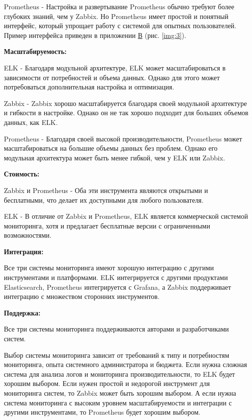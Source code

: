 Prometheus - Настройка и развертывание Prometheus обычно требуют более глубоких знаний, чем у Zabbix.
Но Prometheus имеет простой и понятный интерфейс, который упрощает работу с системой для опытных пользователей.
Пример интерфейса приведен в приложении \hyperlink{app-c}{В} (рис. \ref{img:3}).

\textbf{Масштабируемость:}

ELK - Благодаря модульной архитектуре, ELK может масштабироваться в зависимости от потребностей и объема данных.
Однако для этого может потребоваться дополнительная настройка и оптимизация.

Zabbix - Zabbix хорошо масштабируется благодаря своей модульной архитектуре и гибкости в настройке.
Однако он не так хорошо подходит для больших объемов данных, как ELK.

Prometheus - Благодаря своей высокой производительности, Prometheus может масштабироваться на большие объемы
данных без проблем. Однако его модульная архитектура может быть менее гибкой, чем у ELK или Zabbix.

\textbf{Стоимость:}

Zabbix и Prometheus - Оба эти инструмента являются открытыми и бесплатными, что делает их доступными для любого пользователя.

ELK - В отличие от Zabbix и Prometheus, ELK является коммерческой системой мониторинга, хотя и предлагает
бесплатные версии с ограниченными возможностями.

\textbf{Интеграция:}

Все три системы мониторинга имеют хорошую интеграцию с другими инструментами и платформами.
ELK интегрируется с другими продуктами Elasticsearch, Prometheus интегрируется с Grafana, а Zabbix
поддерживает интеграцию с множеством сторонних инструментов.

\textbf{Поддержка:}

Все три системы мониторинга поддерживаются авторами и разработчиками систем. 

Выбор системы мониторинга зависит от требований к типу и потребностям мониторинга, опыта системного администратора и бюджета.
Если нужна сложная система для анализа логов и мониторинга производительности, то ELK будет хорошим выбором.
Если нужен простой и недорогой инструмент для мониторинга систем, то Zabbix может быть хорошим выбором.
А если нужна система мониторинга с высоким уровнем масштабируемости и интеграции с другими инструментами,
то Prometheus будет хорошим выбором.

